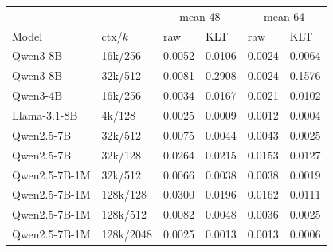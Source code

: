 \begin{tabular}{llllll}
\toprule
 & & \multicolumn{2}{c}{mean 48} & \multicolumn{2}{c}{mean 64} \\
Model & ctx/$k$ & raw & KLT & raw & KLT \\
\midrule
Qwen3-8B & 16k/256 & 0.0052 & 0.0106 & 0.0024 & 0.0064 \\
Qwen3-8B & 32k/512 & 0.0081 & 0.2908 & 0.0024 & 0.1576 \\
Qwen3-4B & 16k/256 & 0.0034 & 0.0167 & 0.0021 & 0.0102 \\
Llama-3.1-8B & 4k/128 & 0.0025 & 0.0009 & 0.0012 & 0.0004 \\
Qwen2.5-7B & 32k/512 & 0.0075 & 0.0044 & 0.0043 & 0.0025 \\
Qwen2.5-7B & 32k/128 & 0.0264 & 0.0215 & 0.0153 & 0.0127 \\
Qwen2.5-7B-1M & 32k/512 & 0.0066 & 0.0038 & 0.0038 & 0.0019 \\
Qwen2.5-7B-1M & 128k/128 & 0.0300 & 0.0196 & 0.0162 & 0.0111 \\
Qwen2.5-7B-1M & 128k/512 & 0.0082 & 0.0048 & 0.0036 & 0.0025 \\
Qwen2.5-7B-1M & 128k/2048 & 0.0025 & 0.0013 & 0.0013 & 0.0006 \\
\bottomrule
\end{tabular}